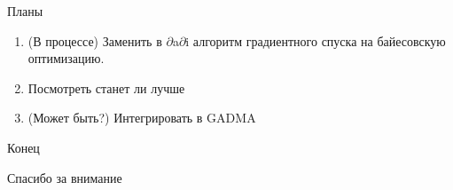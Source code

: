 \documentclass[presentation, smaller]{beamer}
\newcommand{\dadi}{$\partial$a$\partial$i\xspace }
\begin{document}
\begin{frame}[label={sec:orge6f7f5c}]{Планы}
\begin{enumerate}
\item (В процессе) Заменить в \dadi алгоритм градиентного спуска на байесовскую оптимизацию.
\item Посмотреть станет ли лучше
\item (Может быть?) Интегрировать в GADMA
\end{enumerate}
\end{frame}

\begin{frame}[label={sec:org605b64e}]{Конец}
\begin{center}
Спасибо за внимание
\end{center}
\end{frame}
\end{document}
